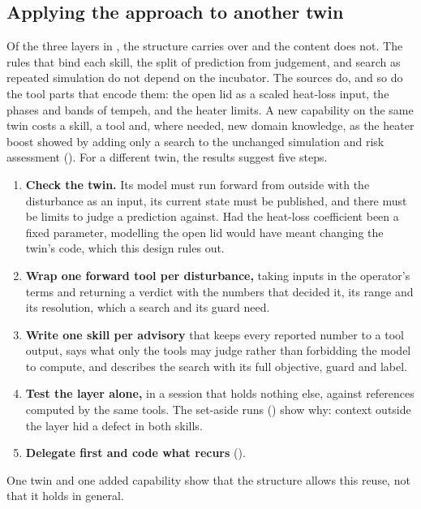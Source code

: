   \subsection{Applying the approach to another twin}
  \label{sec:generality}

  Of the three layers in , the structure carries over and the content does
  not. The rules that bind each skill, the split of prediction from judgement, and search as
  repeated simulation do not depend on the incubator. The sources do, and so do the tool parts
  that encode them: the open lid as a scaled heat-loss input, the phases and bands of tempeh, and
  the heater limits. A new capability on the same twin costs a skill, a tool and, where needed,
  new domain knowledge, as the heater boost showed by adding only a search to the unchanged
  simulation and risk assessment (). For a different twin, the
  results suggest five steps.

  \begin{enumerate}
    \item \textbf{Check the twin.} Its model must run forward from outside with the disturbance as
      an input, its current state must be published, and there must be limits to judge a
      prediction against. Had the heat-loss coefficient been a fixed parameter, modelling the open
      lid would have meant changing the twin's code, which this design rules out.
    \item \textbf{Wrap one forward tool per disturbance,} taking inputs in the operator's terms and
      returning a verdict with the numbers that decided it, its range and its resolution, which a
      search and its guard need.
    \item \textbf{Write one skill per advisory} that keeps every reported number to a tool output,
      says what only the tools may judge rather than forbidding the model to compute, and
      describes the search with its full objective, guard and label.
    \item \textbf{Test the layer alone,} in a session that holds nothing else, against references
      computed by the same tools. The set-aside runs () show why: context
      outside the layer hid a defect in both skills.
    \item \textbf{Delegate first and code what recurs} ().
  \end{enumerate}

  One twin and one added capability show that the structure allows this reuse, not that it holds
  in general.

